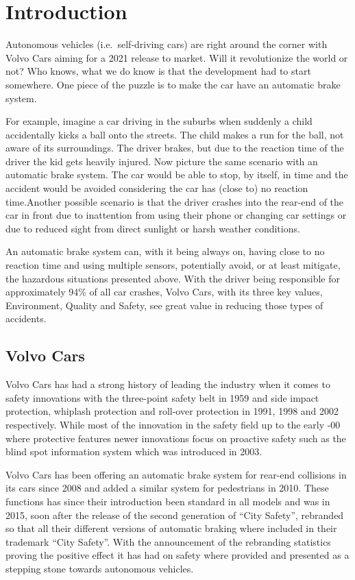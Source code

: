 \documentclass[conference]{IEEEtran}
\begin{document}
\section{Introduction}
Autonomous vehicles (i.e.\ self-driving cars) are right around the corner with Volvo Cars aiming for a 2021 release to market. \cite{ADToMarket} Will it revolutionize the world or not? Who knows, what we do know is that the development had to start somewhere. One piece of the puzzle is to make the car have an automatic brake system. 

For example, imagine a car driving in the suburbs when suddenly a child accidentally kicks a ball onto the streets. The child makes a run for the ball, not aware of its surroundings. The driver brakes, but due to the reaction time of the driver the kid gets heavily injured. Now picture the same scenario with an automatic brake system. The car would be able to stop, by itself, in time and the accident would be avoided considering the car has (close to) no reaction time.Another possible scenario is that the driver crashes into the rear-end of the car in front due to inattention from using their phone or changing car settings or due to reduced sight from direct sunlight or harsh weather conditions.

An automatic brake system can, with it being always on, having close to no reaction time and using multiple sensors, potentially avoid, or at least mitigate, the hazardous situations presented above. With the driver being responsible for approximately 94\% of all car crashes, Volvo Cars, with its three key values, Environment, Quality and Safety, see great value in reducing those types of accidents. \cite{CrashStats,VolvoValues}

\subsection{Volvo Cars}
Volvo Cars has had a strong history of leading the industry when it comes to safety innovations with the three-point safety belt in 1959 and side impact protection, whiplash protection and roll-over protection in 1991, 1998 and 2002 respectively. 
While most of the innovation in the safety field up to the early -00 where protective features newer innovations focus on proactive safety such as the blind spot information system which was introduced in 2003. \cite{VolvoInnovation}

Volvo Cars has been offering an automatic brake system for rear-end collisions in its cars since 2008 and added a similar system for pedestrians in 2010. \cite{VolvoInnovation}
These functions has since their introduction been standard in all models and was in 2015, soon after the release of the second generation of ``City Safety'', rebranded so that all their different versions of automatic braking where included in their trademark ``City Safety''. \cite{CitySafety} With the announcement of the rebranding statistics proving the positive effect it has had on safety where provided and presented as a stepping stone towards autonomous vehicles. \cite{CitySafety}
\end{document}
